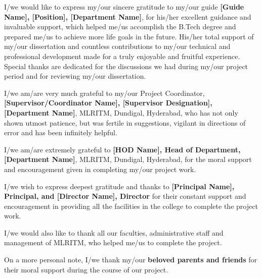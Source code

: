 \documentclass[12pt,a4paper]{report}
\title{\docTitle}
\author{\authorName \\ \authorID \\ Guide: \guide}
\date{\today}  %
\newcommand{\deptName}{[Department Name]}                %
\newcommand{\guide}{[Guide Name]}                       %
\newcommand{\guideDesignation}{[Position]}              %
\newcommand{\supervisor}{[Supervisor/Coordinator Name]}  %
\newcommand{\supervisorDesignation}{[Supervisor Designation]}  %
\newcommand{\hod}{[HOD Name]}                           %
\newcommand{\principal}{[Principal Name]}               %
\newcommand{\director}{[Director Name]}                 %
\begin{document}




\pagestyle{fancy} %

\begin{acknowledgment}
    I/we would like to express my/our sincere gratitude to my/our guide
    \textbf{\guide, \guideDesignation, \deptName}, for his/her excellent guidance and invaluable support, which helped me/us accomplish the B.Tech degree and prepared me/us to achieve more life goals in the future. His/her total support of my/our dissertation and countless contributions to my/our technical and professional development made for a truly enjoyable and fruitful experience. Special thanks are dedicated for the discussions we had during my/our project period and for reviewing my/our dissertation.

    I/we am/are very much grateful to my/our Project Coordinator,
    \textbf{\supervisor, \supervisorDesignation, \deptName}, MLRITM, Dundigal, Hyderabad, who has not only shown utmost patience, but was fertile in suggestions, vigilant in directions of error and has been infinitely helpful.

    I/we am/are extremely grateful to
    \textbf{\hod, Head of Department, \deptName}, MLRITM, Dundigal, Hyderabad, for the moral support and encouragement given in completing my/our project work.

    I/we wish to express deepest gratitude and thanks to
    \textbf{\principal, Principal, and \director, Director} for their constant support and encouragement in providing all the facilities in the college to complete the project work.

    I/we would also like to thank all our faculties, administrative staff and management of MLRITM, who helped me/us to complete the project.

    On a more personal note, I/we thank my/our \textbf{beloved parents and friends} for their moral support during the course of our project.
\end{acknowledgment}
\end{document}
